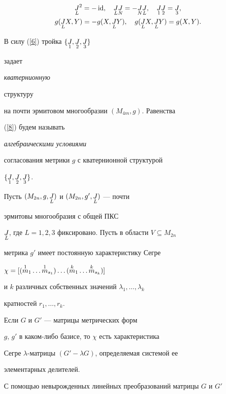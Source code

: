 \begin{gather}\label{6}


\down{L}{J}^2=-\id,\quad \down{L}{J}\down{N}{J}=-\down{N}{J}\down{L}{J},


\quad \down{1}{J} \down{2}{J}=\down{3}{J},\\


%


\label{8}


g(\down{L}{J}X,Y)=-g(X,\down{L}{J}Y),\quad


g(\down{L}{J}X,\down{L}{J}Y)=g(X,Y).


\end{gather}


В силу (\ref{6}) тройка $\{\underset{1}{J},\underset{2}{J},\underset{3}{J}\}$


задает {\it кватернионную


структуру} на почти эрмитовом многообразии $(M_{4m},g)$. Равенства


(\ref{8}) будем называть {\it алгебраическими условиями


согласования метрики $g$ с кватернионной структурой}


$\{\underset{1}{J},\underset{2}{J},\underset{3}{J}\}$.





Пусть $(M_{2n},g,\underset{L}{J})$ и $(M_{2n},g',\underset{L}{J})$ --- почти


эрмитовы многообразия с общей ПКС


$\underset{L}{J}$, где $L=1,2,3$ фиксировано. Пусть в области $V\subseteq M_{2n}$


метрика $g'$ имеет постоянную характеристику Сегре


$\chi =[(\up{1}{m}_1\dotsc


\up{1}{m}_{s_1})\dotsc (\up{k}{m}_1\dotsc


\up{k}{m}_{s_k})]$


и $k$ различных собственных значений $\lambda_1,\dotsc,\lambda_k$


кратностей $r_1,\dotsc, r_k$.


Если $G$ и $G'$ --- матрицы метрических форм


$g$, $g'$ в каком-либо базисе, то $\chi$ есть характеристика


Сегре $\lambda$-матрицы $(G'-\lambda G)$, определяемая системой ее


элементарных делителей.


С помощью невырожденных линейных преобразований матрицы $G$ и $G'$


